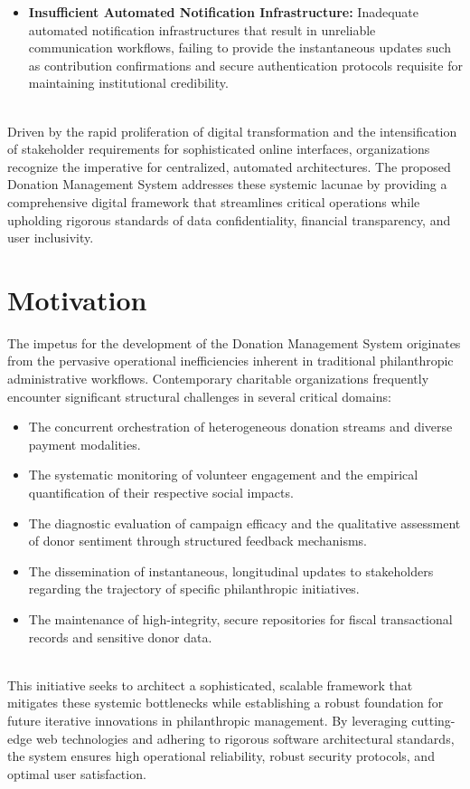 \begin{itemize} \item \textbf{Insufficient Automated Notification Infrastructure:} Inadequate automated notification infrastructures that result in unreliable communication workflows, failing to provide the instantaneous updates such as contribution confirmations and secure authentication protocols requisite for maintaining institutional credibility. \end{itemize} \\ Driven by the rapid proliferation of digital transformation and the intensification of stakeholder requirements for sophisticated online interfaces, organizations recognize the imperative for centralized, automated architectures. The proposed Donation Management System addresses these systemic lacunae by providing a comprehensive digital framework that streamlines critical operations while upholding rigorous standards of data confidentiality, financial transparency, and user inclusivity. 

\section{Motivation}
The impetus for the development of the Donation Management System originates from the pervasive operational inefficiencies inherent in traditional philanthropic administrative workflows. Contemporary charitable organizations frequently encounter significant structural challenges in several critical domains: \begin{itemize} \item The concurrent orchestration of heterogeneous donation streams and diverse payment modalities. \item The systematic monitoring of volunteer engagement and the empirical quantification of their respective social impacts. \item The diagnostic evaluation of campaign efficacy and the qualitative assessment of donor sentiment through structured feedback mechanisms. \item The dissemination of instantaneous, longitudinal updates to stakeholders regarding the trajectory of specific philanthropic initiatives. \item The maintenance of high-integrity, secure repositories for fiscal transactional records and sensitive donor data. \end{itemize}
\\This initiative seeks to architect a sophisticated, scalable framework that mitigates these systemic bottlenecks while establishing a robust foundation for future iterative innovations in philanthropic management. By leveraging cutting-edge web technologies and adhering to rigorous software architectural standards, the system ensures high operational reliability, robust security protocols, and optimal user satisfaction.

